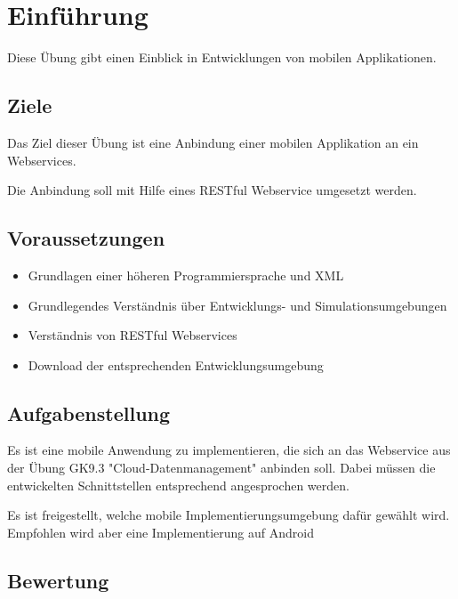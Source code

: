 
\section{Einführung}
Diese Übung gibt einen Einblick in Entwicklungen von mobilen Applikationen.

\subsection{Ziele}
Das Ziel dieser Übung ist eine Anbindung einer mobilen Applikation an ein Webservices.

Die Anbindung soll mit Hilfe eines RESTful Webservice umgesetzt werden.

\subsection{Voraussetzungen}
\begin{itemize}
	\item Grundlagen einer höheren Programmiersprache und XML
	\item Grundlegendes Verständnis über Entwicklungs- und Simulationsumgebungen
	\item Verständnis von RESTful Webservices
	\item Download der entsprechenden Entwicklungsumgebung
\end{itemize}

\subsection{Aufgabenstellung}
Es ist eine mobile Anwendung zu implementieren, die sich an das Webservice aus der Übung GK9.3 "Cloud-Datenmanagement" anbinden soll. Dabei müssen die entwickelten Schnittstellen entsprechend angesprochen werden.

Es ist freigestellt, welche mobile Implementierungsumgebung dafür gewählt wird. Empfohlen wird aber eine Implementierung auf Android

\subsection{Bewertung}

